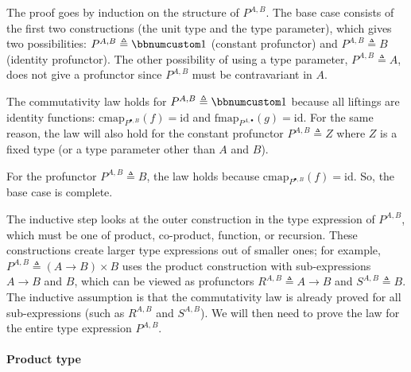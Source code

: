 The proof goes by induction on the structure of $P^{A,B}$. The base
case consists of the first two constructions (the unit type and the
type parameter), which gives two possibilities: $P^{A,B}\triangleq\bbnum 1$
(constant profunctor) and $P^{A,B}\triangleq B$ (identity profunctor).
The other possibility of using a type parameter, $P^{A,B}\triangleq A$,
does not give a profunctor since $P^{A,B}$ must be contravariant
in $A$.

The commutativity law holds for $P^{A,B}\triangleq\bbnum 1$ because
all liftings are identity functions: $\text{cmap}_{P^{\bullet,B}}(f)=\text{id}$
and $\text{fmap}_{P^{A,\bullet}}(g)=\text{id}$. For the same reason,
the law will also hold for the constant profunctor $P^{A,B}\triangleq Z$
where $Z$ is a fixed type (or a type parameter other than $A$ and
$B$).

For the profunctor $P^{A,B}\triangleq B$, the law holds because $\text{cmap}_{P^{\bullet,B}}(f)=\text{id}$.
So, the base case is complete.

The inductive step looks at the outer construction in the type expression
of $P^{A,B}$, which must be one of product, co-product, function,
or recursion. These constructions create larger type expressions out
of smaller ones; for example, $P^{A,B}\triangleq\left(A\rightarrow B\right)\times B$
uses the product construction with sub-expressions $A\rightarrow B$
and $B$, which can be viewed as profunctors $R^{A,B}\triangleq A\rightarrow B$
and $S^{A,B}\triangleq B$. The inductive assumption is that the commutativity
law is already proved for all sub-expressions (such as $R^{A,B}$
and $S^{A,B}$). We will then need to prove the law for the entire
type expression $P^{A,B}$.

\paragraph{Product type}


